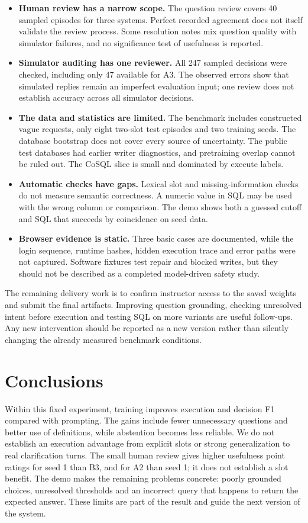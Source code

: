 \documentclass[11pt,a4paper]{article}
\begin{document}
\begin{itemize}
\item \textbf{Human review has a narrow scope.} The question review covers 40 sampled episodes for three
systems. Perfect recorded agreement does not itself validate the review process. Some resolution notes
mix question quality with simulator failures, and no significance test of usefulness is reported.
\item \textbf{Simulator auditing has one reviewer.} All 247 sampled decisions were checked, including
only 47 available for A3. The observed errors show that simulated replies remain an imperfect evaluation input;
one review does not establish accuracy across all simulator decisions.
\item \textbf{The data and statistics are limited.} The benchmark includes constructed vague requests,
only eight two-slot test episodes and two training seeds. The database bootstrap does not cover every
source of uncertainty. The public test databases had earlier writer diagnostics, and pretraining overlap
cannot be ruled out. The CoSQL slice is small and dominated by execute labels.
\item \textbf{Automatic checks have gaps.} Lexical slot and missing-information checks do not measure
semantic correctness. A numeric value in SQL may be used with the wrong column or comparison. The demo
shows both a guessed cutoff and SQL that succeeds by coincidence on seed data.
\item \textbf{Browser evidence is static.} Three basic cases are documented, while the login sequence,
runtime hashes, hidden execution trace and error paths were not captured. Software fixtures test repair and blocked writes,
but they should not be described as a completed model-driven safety study.
\end{itemize}

The remaining delivery work is to confirm instructor access to the saved weights and submit the final
artifacts. Improving question
grounding, checking unresolved intent before execution and testing SQL on more variants are useful
follow-ups. Any new intervention should be reported as a new version rather than silently changing the
already measured benchmark conditions.

\section{Conclusions}

Within this fixed experiment, training improves execution and decision F1 compared with prompting.
The gains include fewer unnecessary questions and better use of definitions, while abstention becomes
less reliable. We do not establish an execution advantage from explicit slots or strong generalization
to real clarification turns. The small human review gives higher usefulness point ratings for seed 1 than
B3, and for A2 than seed 1; it does not establish a slot benefit. The demo makes the remaining problems concrete: poorly grounded choices,
unresolved thresholds and an incorrect query that happens to return the expected answer. These limits
are part of the result and guide the next version of the system.
\end{document}
